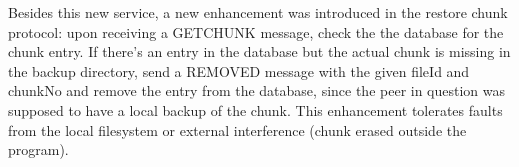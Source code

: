 \documentclass[a4paper]{article}
\begin{document}
Besides this new service, a new enhancement was introduced in the restore chunk protocol: upon receiving a GETCHUNK message, check the the database for the chunk entry. If there's an entry in the database but the actual chunk is missing in the backup directory, send a REMOVED message with the given fileId and chunkNo and remove the entry from the database, since the peer in question was supposed to have a local backup of the chunk. This enhancement tolerates faults from the local filesystem or external interference (chunk erased outside the program).


 
\end{document}
